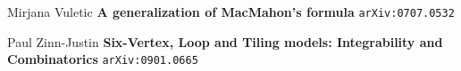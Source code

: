 \documentclass[12pt]{article}
\begin{document}
\newpage

\selectfont \fontsize{12}{10}\selectfont


\begin{thebibliography}{}

\item Mirjana Vuletic \textbf{A generalization of MacMahon's formula} \texttt{arXiv:0707.0532}

\item Paul Zinn-Justin \textbf{Six-Vertex, Loop and Tiling models: Integrability and Combinatorics} \texttt{arXiv:0901.0665}


\end{thebibliography}
\end{document}
